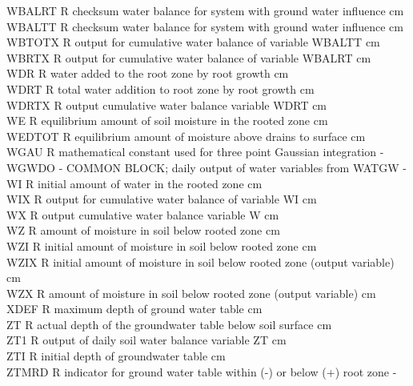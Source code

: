 \documentclass[11pt]{article}
\begin{document}
\begin{tabbing}
WBALRT\> \> R\> checksum water balance for system with ground water influence\> \> \> \> \> \> \> cm\\
WBALTT\> \> R\> checksum water balance for system with ground water influence\> \> \> \> \> \> \> cm\\
WBTOTX\> \> R\> output for cumulative water balance of variable WBALTT\> \> \> \> \> \> \> cm\\
WBRTX\> \> R\> output for cumulative water balance of variable WBALRT\> \> \> \> \> \> \> cm\\
WDR\> \> R\> water added to the root zone by root growth\> \> \> \> \> \> \> cm\\
WDRT\> \> R\> total water addition to root zone by root growth\> \> \> \> \> \> \> cm\\
WDRTX\> \> R\> output cumulative water balance variable WDRT\> \> \> \> \> \> \> cm\\
WE\> \> R\> equilibrium amount of soil moisture in the rooted zone\> \> \> \> \> \> \> cm\\
WEDTOT\> \> R\> equilibrium amount of moisture above drains to surface\> \> \> \> \> \> \> cm\\
WGAU\> \> R\> mathematical constant used for three point Gaussian integration\> \> \> \> \> \> \> -\\
WGWDO\> \> -\> COMMON BLOCK; daily output of water variables from WATGW\> \> \> \> \> \> \> -\\
WI\> \> R\> initial amount of water in the rooted zone\> \> \> \> \> \> \> cm\\
WIX\> \> R\> output for cumulative water balance of variable WI\> \> \> \> \> \> \> cm\\
WX\> \> R\> output cumulative water balance variable W\> \> \> \> \> \> \> cm\\
WZ\> \> R\> amount of moisture in soil below rooted zone\> \> \> \> \> \> \> cm\\
WZI\> \> R\> initial amount of moisture in soil below rooted zone\> \> \> \> \> \> \> cm\\
WZIX\> \> R\> initial amount of moisture in soil below rooted zone (output variable)\> \> \> \> \> \> \> cm\\
WZX\> \> R\> amount of moisture in soil below rooted zone (output variable)\> \> \> \> \> \> \> cm\\
XDEF\> \> R\> maximum depth of ground water table\> \> \> \> \> \> \> cm\\
ZT\> \> R\> actual depth of the groundwater table below soil surface\> \> \> \> \> \> \> cm\\
ZT1\> \> R\> output of daily soil water balance variable ZT\> \> \> \> \> \> \> cm\\
ZTI\> \> R\> initial depth of groundwater table\> \> \> \> \> \> \> cm\\
ZTMRD\> \> R\> indicator for ground water table within (-) or below (+) root zone\> \> \> \> \> \> \> -
\end{tabbing}
\end{document}
